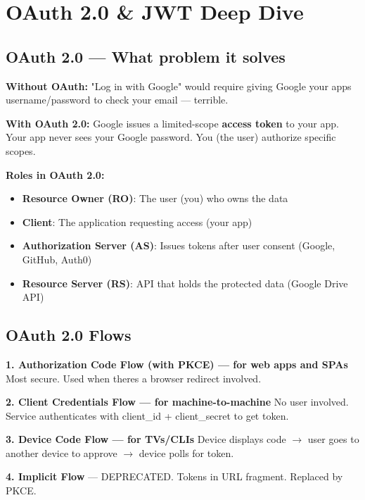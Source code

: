 \documentclass[11pt]{article}
\providecommand{\tightlist}{\setlength{\itemsep}{1pt}\setlength{\parskip}{0pt}}
\begin{document}
\section{OAuth 2.0 \& JWT Deep Dive}\label{oauth-20--jwt-deep-dive}

\subsection{OAuth 2.0 --- What problem it solves}\label{oauth-20--what-problem-it-solves}

\textbf{Without OAuth:} "Log in with Google" would require giving Google your app\textquotesingle s username/password to check your email --- terrible.

\textbf{With OAuth 2.0:} Google issues a limited-scope \textbf{access token} to your app. Your app never sees your Google password. You (the user) authorize specific scopes.

\textbf{Roles in OAuth 2.0:}

\begin{itemize}
\tightlist
\item
  \textbf{Resource Owner (RO)}: The user (you) who owns the data
\item
  \textbf{Client}: The application requesting access (your app)
\item
  \textbf{Authorization Server (AS)}: Issues tokens after user consent (Google, GitHub, Auth0)
\item
  \textbf{Resource Server (RS)}: API that holds the protected data (Google Drive API)
\end{itemize}

\subsection{OAuth 2.0 Flows}\label{oauth-20-flows}

\textbf{1. Authorization Code Flow (with PKCE) --- for web apps and SPAs}
Most secure. Used when there\textquotesingle s a browser redirect involved.

\textbf{2. Client Credentials Flow --- for machine-to-machine}
No user involved. Service authenticates with client\_id + client\_secret to get token.

\textbf{3. Device Code Flow --- for TVs/CLIs}
Device displays code \(\rightarrow\) user goes to another device to approve \(\rightarrow\) device polls for token.

\textbf{4. Implicit Flow} --- DEPRECATED. Tokens in URL fragment. Replaced by PKCE.
\end{document}
